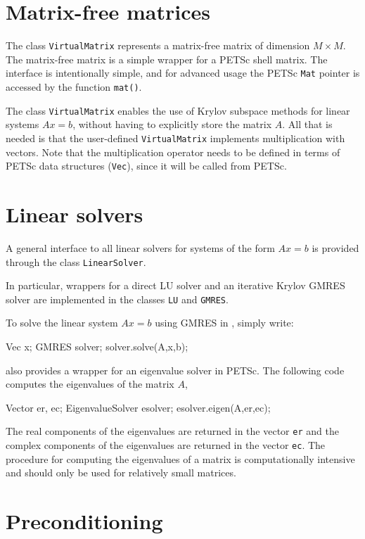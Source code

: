 \section{Matrix-free matrices}

The \dolfin{} class \texttt{VirtualMatrix} represents a matrix-free 
matrix of dimension $M\times M$. 
The matrix-free matrix is a simple wrapper for a PETSc shell matrix. 
The interface is intentionally simple, and for advanced usage the 
PETSc \texttt{Mat} pointer is accessed by the function \texttt{mat()}.  

The class \texttt{VirtualMatrix} enables the use of Krylov subspace
methods for linear systems $Ax = b$, without having to explicitly
store the matrix $A$. All that is needed is that the user-defined
\texttt{VirtualMatrix} implements multiplication with vectors. 
Note that the multiplication operator needs to be defined in terms of
PETSc data structures (\texttt{Vec}), since it will be called from PETSc.

\section{Linear solvers}

A general interface to all linear solvers for systems of the form 
$Ax=b$ is provided through the class \texttt{LinearSolver}. 

In particular, wrappers for a direct LU solver and an iterative 
Krylov GMRES solver are implemented in the classes \texttt{LU} and \texttt{GMRES}. 

To solve the linear system $Ax=b$ using GMRES in \dolfin{}, simply write:  
%
\begin{code} 
Vec x;
GMRES solver; 
solver.solve(A,x,b);
\end{code} 
%
\dolfin{} also provides a wrapper for an eigenvalue 
solver in PETSc. The following code computes the 
eigenvalues of the matrix $A$,
\begin{code} 
Vector er, ec;
EigenvalueSolver esolver; 
esolver.eigen(A,er,ec);
\end{code} 
The real components of the eigenvalues are returned in the vector \texttt{er} and
the complex components of the eigenvalues are returned in the vector \texttt{ec}.
The procedure for computing the eigenvalues of a matrix is computationally 
intensive and should only be used for relatively small matrices.


\section{Preconditioning}


